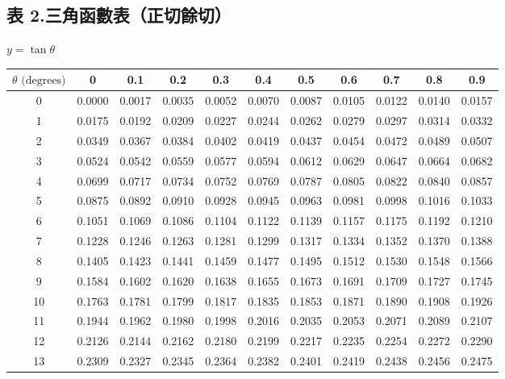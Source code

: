 \subsection*{表 2.\quad 三角函數表（正切餘切）}
\begin{center} $y = \tan\theta$ \end{center}
{\centering\fontsize{7.5pt}{8.8pt}\selectfont\setlength{\tabcolsep}{3.5pt}\renewcommand{\arraystretch}{0.96}
\begin{tabular}{|c|cccccccccc|}
\hline
$\theta\text{ (degrees)}$ & 0 & 0.1 & 0.2 & 0.3 & 0.4 & 0.5 & 0.6 & 0.7 & 0.8 & 0.9 \\ \hline
0 & 0.0000 & 0.0017 & 0.0035 & 0.0052 & 0.0070 & 0.0087 & 0.0105 & 0.0122 & 0.0140 & 0.0157 \\
1 & 0.0175 & 0.0192 & 0.0209 & 0.0227 & 0.0244 & 0.0262 & 0.0279 & 0.0297 & 0.0314 & 0.0332 \\
2 & 0.0349 & 0.0367 & 0.0384 & 0.0402 & 0.0419 & 0.0437 & 0.0454 & 0.0472 & 0.0489 & 0.0507 \\
3 & 0.0524 & 0.0542 & 0.0559 & 0.0577 & 0.0594 & 0.0612 & 0.0629 & 0.0647 & 0.0664 & 0.0682 \\
4 & 0.0699 & 0.0717 & 0.0734 & 0.0752 & 0.0769 & 0.0787 & 0.0805 & 0.0822 & 0.0840 & 0.0857 \\
\hline
5 & 0.0875 & 0.0892 & 0.0910 & 0.0928 & 0.0945 & 0.0963 & 0.0981 & 0.0998 & 0.1016 & 0.1033 \\
6 & 0.1051 & 0.1069 & 0.1086 & 0.1104 & 0.1122 & 0.1139 & 0.1157 & 0.1175 & 0.1192 & 0.1210 \\
7 & 0.1228 & 0.1246 & 0.1263 & 0.1281 & 0.1299 & 0.1317 & 0.1334 & 0.1352 & 0.1370 & 0.1388 \\
8 & 0.1405 & 0.1423 & 0.1441 & 0.1459 & 0.1477 & 0.1495 & 0.1512 & 0.1530 & 0.1548 & 0.1566 \\
9 & 0.1584 & 0.1602 & 0.1620 & 0.1638 & 0.1655 & 0.1673 & 0.1691 & 0.1709 & 0.1727 & 0.1745 \\
\hline
10 & 0.1763 & 0.1781 & 0.1799 & 0.1817 & 0.1835 & 0.1853 & 0.1871 & 0.1890 & 0.1908 & 0.1926 \\
11 & 0.1944 & 0.1962 & 0.1980 & 0.1998 & 0.2016 & 0.2035 & 0.2053 & 0.2071 & 0.2089 & 0.2107 \\
12 & 0.2126 & 0.2144 & 0.2162 & 0.2180 & 0.2199 & 0.2217 & 0.2235 & 0.2254 & 0.2272 & 0.2290 \\
13 & 0.2309 & 0.2327 & 0.2345 & 0.2364 & 0.2382 & 0.2401 & 0.2419 & 0.2438 & 0.2456 & 0.2475 \\

\end{tabular}}
